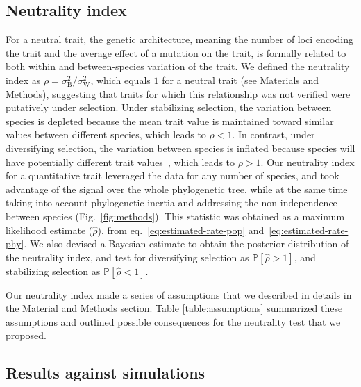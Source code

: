 \documentclass{article}
\newcommand{\proba}{\mathbb{P}}
\newcommand{\RateBetween}{\sigma^2_{\mathrm{B}}}
\newcommand{\RateWhithin}{\sigma^2_{\mathrm{W}}}
\newcommand{\NI}{\rho}
\newcommand{\EstNI}{\widehat{\rho}}
\begin{document}
\subsection*{Neutrality index}

For a neutral trait, the genetic architecture, meaning the number of loci encoding the trait and the average effect of a mutation on the trait, is formally related to both within and between-species variation of the trait.
We defined the neutrality index as $\NI = \RateBetween/\RateWhithin$, which equals $1$ for a neutral trait (see Materials and Methods), suggesting that traits for which this relationship was not verified were putatively under selection.
Under stabilizing selection, the variation between species is depleted because the mean trait value is maintained toward similar values between different species, which leads to $\NI < 1$.
In contrast, under diversifying selection, the variation between species is inflated because species will have potentially different trait values~\parencite{hansen_stabilizing_1997}, which leads to $\NI > 1$.
Our neutrality index for a quantitative trait leveraged the data for any number of species, and took advantage of the signal over the whole phylogenetic tree, while at the same time taking into account phylogenetic inertia and addressing the non-independence between species (Fig.~\ref{fig:methods}).
This statistic was obtained as a maximum likelihood estimate ($\EstNI$), from eq.~\ref{eq:estimated-rate-pop} and~\ref{eq:estimated-rate-phy}.
We also devised a Bayesian estimate to obtain the posterior distribution of the neutrality index, and test for diversifying selection as $\proba [\EstNI > 1]$, and stabilizing selection as $\proba [\EstNI < 1]$.

Our neutrality index made a series of assumptions that we described in details in the Material and Methods section.
Table \ref{table:assumptions} summarized these assumptions and outlined possible consequences for the neutrality test that we proposed.

\subsection*{Results against simulations}\label{subsec:results-against-simulations}
\end{document}
